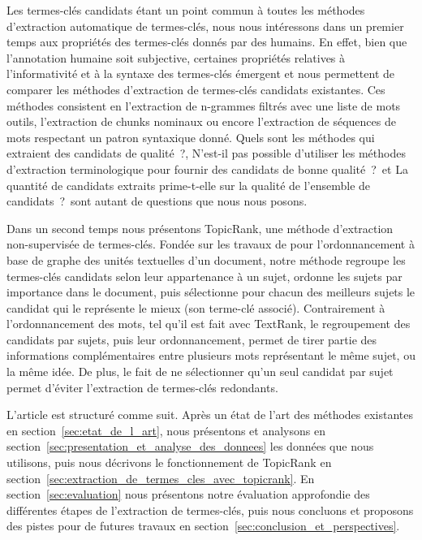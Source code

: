   Les termes-clés candidats étant un point commun à toutes les méthodes
  d'extraction automatique de termes-clés, nous nous intéressons dans un premier
  temps aux propriétés des termes-clés donnés par des humains. En effet, bien
  que l'annotation humaine soit subjective, certaines propriétés relatives à
  l'informativité et à la syntaxe des termes-clés émergent et nous permettent de
  comparer les méthodes d'extraction de termes-clés candidats existantes. Ces
  méthodes consistent en l'extraction de n-grammes filtrés avec une liste de
  mots outils, l'extraction de chunks nominaux ou encore l'extraction de
  séquences de mots respectant un patron syntaxique donné. \og Quels sont les
  méthodes qui extraient des candidats de qualité~?\fg, \og N'est-il pas
  possible d'utiliser les méthodes d'extraction terminologique pour fournir des
  candidats de bonne qualité~?\fg\ et \og La quantité de candidats extraits
  prime-t-elle sur la qualité de l'ensemble de candidats~?\fg\ sont autant de
  questions que nous nous posons.

  Dans un second temps nous présentons TopicRank, une méthode d'extraction
  non-supervisée de termes-clés. Fondée sur les travaux de
   pour l'ordonnancement à base de
  graphe des unités textuelles d'un document, notre méthode regroupe les
  termes-clés candidats selon leur appartenance à un sujet, ordonne les sujets
  par importance dans le document, puis sélectionne pour chacun des meilleurs
  sujets le candidat qui le représente le mieux (son terme-clé associé).
  Contrairement à l'ordonnancement des mots, tel qu'il est fait avec TextRank,
  le regroupement des candidats par sujets, puis leur ordonnancement, permet de
  tirer partie des informations complémentaires entre plusieurs mots
  représentant le même sujet, ou la même idée. De plus, le fait de ne
  sélectionner qu'un seul candidat par sujet permet d'éviter l'extraction de
  termes-clés redondants.

  L'article est structuré comme suit. Après un état de l'art des méthodes
  existantes en section~\ref{sec:etat_de_l_art}, nous présentons et analysons en
  section~\ref{sec:presentation_et_analyse_des_donnees} les données que nous
  utilisons, puis nous décrivons le fonctionnement de TopicRank en
  section~\ref{sec:extraction_de_termes_cles_avec_topicrank}. En
  section~\ref{sec:evaluation} nous présentons notre évaluation approfondie des
  différentes étapes de l'extraction de termes-clés, puis nous concluons et
  proposons des pistes pour de futures travaux en
  section~\ref{sec:conclusion_et_perspectives}.

